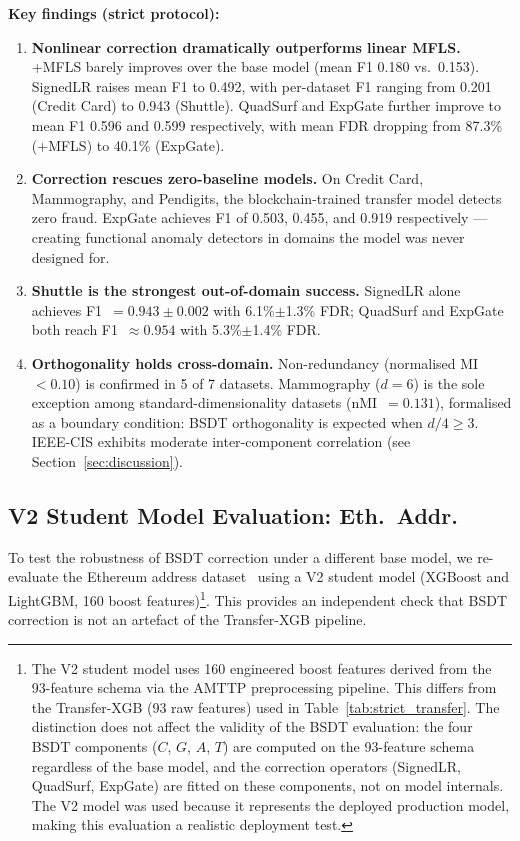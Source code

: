 \documentclass[journal]{IEEEtran}
\begin{document}
\textbf{Key findings (strict protocol):}

\begin{enumerate}
  \item \textbf{Nonlinear correction dramatically outperforms linear MFLS.} +MFLS barely improves over the base model (mean F1 0.180 vs.\ 0.153). SignedLR raises mean F1 to 0.492, with per-dataset F1 ranging from 0.201 (Credit Card) to 0.943 (Shuttle). QuadSurf and ExpGate further improve to mean F1 0.596 and 0.599 respectively, with mean FDR dropping from 87.3\% (+MFLS) to 40.1\% (ExpGate).

  \item \textbf{Correction rescues zero-baseline models.} On Credit Card, Mammography, and Pendigits, the blockchain-trained transfer model detects zero fraud. ExpGate achieves F1 of 0.503, 0.455, and 0.919 respectively --- creating functional anomaly detectors in domains the model was never designed for.

  \item \textbf{Shuttle is the strongest out-of-domain success.} SignedLR alone achieves F1~$= 0.943\pm0.002$ with 6.1\%$\pm$1.3\% FDR; QuadSurf and ExpGate both reach F1~$\approx 0.954$ with 5.3\%$\pm$1.4\% FDR.

  \item \textbf{Orthogonality holds cross-domain.} Non-redundancy (normalised MI $< 0.10$) is confirmed in 5 of 7 datasets. Mammography ($d = 6$) is the sole exception among standard-dimensionality datasets (nMI~$= 0.131$), formalised as a boundary condition: BSDT orthogonality is expected when $d/4 \geq 3$. IEEE-CIS exhibits moderate inter-component correlation (see Section~\ref{sec:discussion}).
\end{enumerate}

\subsection{V2 Student Model Evaluation: Eth.\ Addr.}
\label{ssec:external_eth}

To test the robustness of BSDT correction under a different base model, we re-evaluate the Ethereum address dataset~\cite{musayev2022ethfraud} using a V2 student model (XGBoost and LightGBM, 160 boost features)\footnote{The V2 student model uses 160 engineered boost features derived from the 93-feature schema via the AMTTP preprocessing pipeline. This differs from the Transfer-XGB (93 raw features) used in Table~\ref{tab:strict_transfer}. The distinction does not affect the validity of the BSDT evaluation: the four BSDT components ($C$, $G$, $A$, $T$) are computed on the 93-feature schema regardless of the base model, and the correction operators (SignedLR, QuadSurf, ExpGate) are fitted on these components, not on model internals. The V2 model was used because it represents the deployed production model, making this evaluation a realistic deployment test.}. This provides an independent check that BSDT correction is not an artefact of the Transfer-XGB pipeline.
\end{document}
